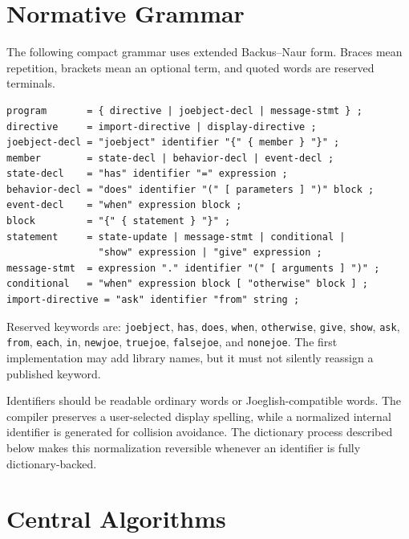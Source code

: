 \documentclass[12pt]{article}
\begin{document}
\clearpage
\section{Normative Grammar}
The following compact grammar uses extended Backus--Naur form. Braces mean repetition, brackets mean an optional term, and quoted words are reserved terminals.

\begin{lstlisting}[style=joe]
program       = { directive | joebject-decl | message-stmt } ;
directive     = import-directive | display-directive ;
joebject-decl = "joebject" identifier "{" { member } "}" ;
member        = state-decl | behavior-decl | event-decl ;
state-decl    = "has" identifier "=" expression ;
behavior-decl = "does" identifier "(" [ parameters ] ")" block ;
event-decl    = "when" expression block ;
block         = "{" { statement } "}" ;
statement     = state-update | message-stmt | conditional |
                "show" expression | "give" expression ;
message-stmt  = expression "." identifier "(" [ arguments ] ")" ;
conditional   = "when" expression block [ "otherwise" block ] ;
import-directive = "ask" identifier "from" string ;
\end{lstlisting}

Reserved keywords are: \texttt{joebject}, \texttt{has}, \texttt{does}, \texttt{when}, \texttt{otherwise}, \texttt{give}, \texttt{show}, \texttt{ask}, \texttt{from}, \texttt{each}, \texttt{in}, \texttt{newjoe}, \texttt{truejoe}, \texttt{falsejoe}, and \texttt{nonejoe}. The first implementation may add library names, but it must not silently reassign a published keyword.

Identifiers should be readable ordinary words or Joeglish-compatible words. The compiler preserves a user-selected display spelling, while a normalized internal identifier is generated for collision avoidance. The dictionary process described below makes this normalization reversible whenever an identifier is fully dictionary-backed.

\clearpage
\section{Central Algorithms}
\end{document}
